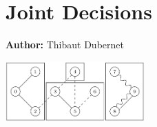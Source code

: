 \chapter{Joint Decisions }
\label{ch:jointtrips}

\hfill \textbf{Author:} Thibaut Dubernet

\begin{center} \includegraphics[width=0.4\textwidth, angle=0]{extending/figures/Jointtrips/group.png} \end{center}

